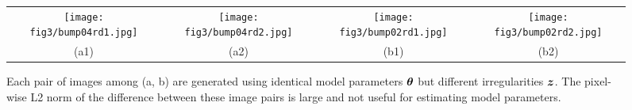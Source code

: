 \begin{figure}[t]
	\addtolength{\tabcolsep}{-5pt}
	\begin{tabular}{cccc}
		\texttt{[image: fig3/bump04rd1.jpg]} &
		\texttt{[image: fig3/bump04rd2.jpg]} &
		\texttt{[image: fig3/bump02rd1.jpg]} &
		\texttt{[image: fig3/bump02rd2.jpg]} \\
		(a1) & (a2) & (b1) & (b2)
	\end{tabular}
	\captionsetup{labelfont=bf,textfont=it}
	\caption{\label{fig:syn1}
		Each pair of images among (a, b) are generated using identical model parameters $\bm{\theta}$ but different irregularities $\bm{z}$. The pixel-wise L2 norm of the difference between these image pairs is large and not useful for estimating model parameters.
	}
\end{figure}